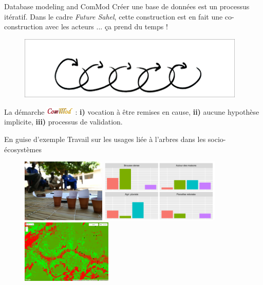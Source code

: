 \documentclass[newPxFont]{beamer}
\begin{document}
\begin{frame}[c]{Database modeling and ComMod}
\vspace{-2em}
Créer une base de données est un processus itératif. Dans le cadre \textit{Future Sahel}, cette construction est en fait une co-construction avec les acteurs ... ça prend du temps !
\begin{figure}
	\centering
	\includegraphics[height = 3cm]{img/iteration}
\end{figure}
La démarche \includegraphics[height = 0.4cm]{img/logo_commod} : \textbf{i)} vocation à être remises en cause, \textbf{ii)} aucune hypothèse implicite, \textbf{iii)} processus de
validation.

\end{frame}

\begin{frame}[c]{En guise d'exemple}
\vspace{-2em}
Travail sur les usages liée à l'arbres dans les socio-écosystèmes
\begin{figure}
	\centering
	\includegraphics[height = 3cm]{img/ateliers}
  \includegraphics[height = 3cm]{img/bar_general}\\
  \includegraphics[height = 3cm]{img/class_CART}
\end{figure}
\end{frame}
\end{document}
